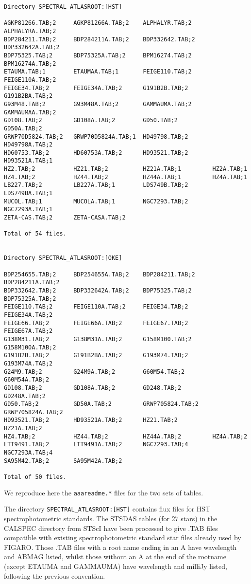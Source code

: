\goodbreak
\begin{verbatim}
Directory SPECTRAL_ATLASROOT:[HST]

AGKP81266.TAB;2     AGKP81266A.TAB;2    ALPHALYR.TAB;2      ALPHALYRA.TAB;2
BDP284211.TAB;2     BDP284211A.TAB;2    BDP332642.TAB;2     BDP332642A.TAB;2
BDP75325.TAB;2      BDP75325A.TAB;2     BPM16274.TAB;2      BPM16274A.TAB;2
ETAUMA.TAB;1        ETAUMAA.TAB;1       FEIGE110.TAB;2      FEIGE110A.TAB;2
FEIGE34.TAB;2       FEIGE34A.TAB;2      G191B2B.TAB;2       G191B2BA.TAB;2
G93M48.TAB;2        G93M48A.TAB;2       GAMMAUMA.TAB;2      GAMMAUMAA.TAB;2
GD108.TAB;2         GD108A.TAB;2        GD50.TAB;2          GD50A.TAB;2
GRWP70D5824.TAB;2   GRWP70D5824A.TAB;1  HD49798.TAB;2       HD49798A.TAB;2
HD60753.TAB;2       HD60753A.TAB;2      HD93521.TAB;2       HD93521A.TAB;1
HZ2.TAB;2           HZ21.TAB;2          HZ21A.TAB;1         HZ2A.TAB;1
HZ4.TAB;2           HZ44.TAB;2          HZ44A.TAB;1         HZ4A.TAB;1
LB227.TAB;2         LB227A.TAB;1        LDS749B.TAB;2       LDS749BA.TAB;1
MUCOL.TAB;1         MUCOLA.TAB;1        NGC7293.TAB;2       NGC7293A.TAB;1
ZETA-CAS.TAB;2      ZETA-CASA.TAB;2

Total of 54 files.


Directory SPECTRAL_ATLASROOT:[OKE]

BDP254655.TAB;2     BDP254655A.TAB;2    BDP284211.TAB;2     BDP284211A.TAB;2
BDP332642.TAB;2     BDP332642A.TAB;2    BDP75325.TAB;2      BDP75325A.TAB;2
FEIGE110.TAB;2      FEIGE110A.TAB;2     FEIGE34.TAB;2       FEIGE34A.TAB;2
FEIGE66.TAB;2       FEIGE66A.TAB;2      FEIGE67.TAB;2       FEIGE67A.TAB;2
G138M31.TAB;2       G138M31A.TAB;2      G158M100.TAB;2      G158M100A.TAB;2
G191B2B.TAB;2       G191B2BA.TAB;2      G193M74.TAB;2       G193M74A.TAB;2
G24M9.TAB;2         G24M9A.TAB;2        G60M54.TAB;2        G60M54A.TAB;2
GD108.TAB;2         GD108A.TAB;2        GD248.TAB;2         GD248A.TAB;2
GD50.TAB;2          GD50A.TAB;2         GRWP705824.TAB;2    GRWP705824A.TAB;2
HD93521.TAB;2       HD93521A.TAB;2      HZ21.TAB;2          HZ21A.TAB;2
HZ4.TAB;2           HZ44.TAB;2          HZ44A.TAB;2         HZ4A.TAB;2
LTT9491.TAB;2       LTT9491A.TAB;2      NGC7293.TAB;4       NGC7293A.TAB;4
SA95M42.TAB;2       SA95M42A.TAB;2

Total of 50 files.
\end{verbatim}

We reproduce here the {\tt aaareadme.*} files for the two sets of
tables.

The directory {\tt SPECTRAL\_ATLASROOT:[HST]} contains flux files for
HST spectrophotometric standards. The STSDAS tables (for 27 stars) in
the CALSPEC directory from STScI have been processed to give .TAB files
compatible with existing spectrophotometric standard star files already
used by FIGARO. Those .TAB files with a root name ending in an A have
wavelength and ABMAG listed, whilst those without an A at the end of the
rootname (except ETAUMA and GAMMAUMA) have wavelength and milliJy
listed, following the previous convention.

